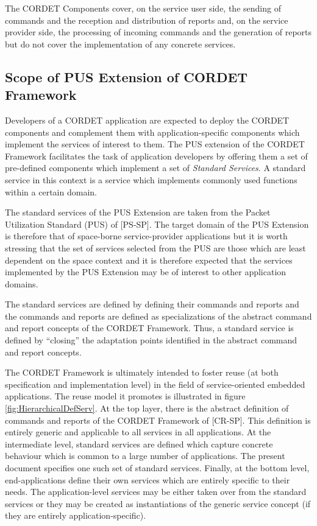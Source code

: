\documentclass{pnp_article}
\begin{document}
The CORDET Components cover, on the service user side, the sending of commands and the reception and distribution of reports and, on the service provider side, the processing of incoming commands and the generation of reports but do not cover the implementation of any concrete services. 

\subsection{Scope of PUS Extension of CORDET Framework}\label{sec:ScopePusExt}
Developers of a CORDET application are expected to deploy the CORDET components and complement them with application-specific components which implement the services of interest to them. The PUS extension of the CORDET Framework facilitates the task of application developers by offering them a set of pre-defined components which implement a set of \textit{Standard Services}. A standard service in this context is a service which implements commonly used functions within a certain domain. 

The standard services of the PUS Extension are taken from the Packet Utilization Standard (PUS) of [PS-SP]. The target domain of the PUS Extension is therefore that of space-borne service-provider applications but it is worth stressing that the set of services selected from the PUS are those which are least dependent on the space context and it is therefore expected that the services implemented by the PUS Extension may be of interest to other application domains.

The standard services are defined by defining their commands and reports and the commands and reports are defined as specializations of the abstract command and report concepts of the CORDET Framework. Thus, a standard service is defined by “closing” the adaptation points identified in the abstract command and report concepts.

The CORDET Framework is ultimately intended to foster reuse (at both specification and implementation level) in the field of service-oriented embedded applications. The reuse model it promotes is illustrated in figure \ref{fig:HierarchicalDefServ}. At the top layer, there is the abstract definition of commands and reports of the CORDET Framework of [CR-SP]. This definition is entirely generic and applicable to all services in all applications. At the intermediate level, standard services are defined which capture concrete behaviour which is common to a large number of applications. The present document specifies one such set of standard services. Finally, at the bottom level, end-applications define their own services which are entirely specific to their needs. The application-level services may be either taken over from the standard services or they may be created as instantiations of the generic service concept (if they are entirely application-specific).
\end{document}
